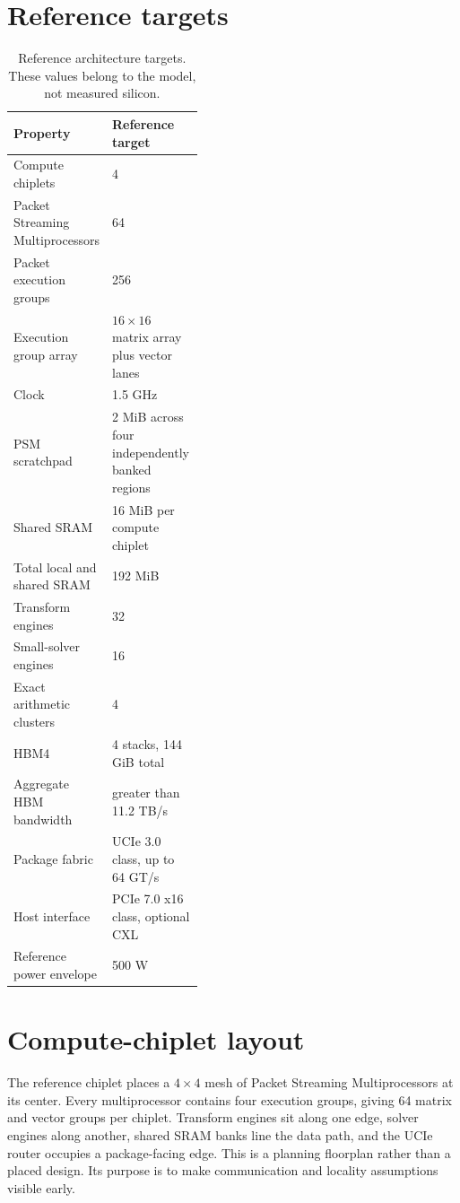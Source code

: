 \documentclass[11pt,oneside,openany]{book}
\theoremstyle{remark}
\begin{document}
\section{Reference targets}
\begin{table}[H]
\centering
\caption{Reference architecture targets. These values belong to the model, not measured silicon.}
\begin{tabularx}{0.94\linewidth}{L{0.42\linewidth}Y}
\toprule
Property & Reference target \\
\midrule
Compute chiplets & 4 \\
Packet Streaming Multiprocessors & 64 \\
Packet execution groups & 256 \\
Execution group array & $16\times16$ matrix array plus vector lanes \\
Clock & 1.5 GHz \\
PSM scratchpad & 2 MiB across four independently banked regions \\
Shared SRAM & 16 MiB per compute chiplet \\
Total local and shared SRAM & 192 MiB \\
Transform engines & 32 \\
Small-solver engines & 16 \\
Exact arithmetic clusters & 4 \\
HBM4 & 4 stacks, 144 GiB total \\
Aggregate HBM bandwidth & greater than 11.2 TB/s \\
Package fabric & UCIe 3.0 class, up to 64 GT/s \\
Host interface & PCIe 7.0 x16 class, optional CXL \\
Reference power envelope & 500 W \\
\bottomrule
\end{tabularx}
\end{table}

\section{Compute-chiplet layout}
The reference chiplet places a $4\times4$ mesh of Packet Streaming Multiprocessors at its center. Every multiprocessor contains four execution groups, giving 64 matrix and vector groups per chiplet. Transform engines sit along one edge, solver engines along another, shared SRAM banks line the data path, and the UCIe router occupies a package-facing edge. This is a planning floorplan rather than a placed design. Its purpose is to make communication and locality assumptions visible early.
\end{document}

